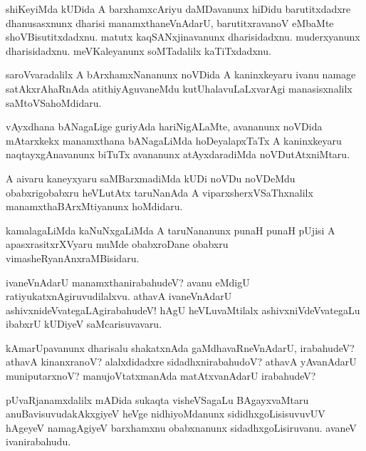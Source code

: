\documentclass{article}
\begin{document}
\begin{mn}
shiKeyiMda kUDida A barxhamxcAriyu daMDavanunx hiDidu barutitxdadxre dhanusasxnunx dharisi 
manamxthaneVnAdarU, barutitxravanoV eMbaMte shoVBisutitxdadxnu. matutx kaqSANxjinavanunx 
dharisidadxnu. muderxyanunx dharisidadxnu. meVKaleyanunx soMTadalilx kaTiTxdadxnu.
\end{mn}

\begin{mn}
saroVvaradalilx A bArxhamxNananunx noVDida A kaninxkeyaru ivanu namage satAkxrAhaRnAda 
atithiyAguvaneMdu kutUhalavuLaLxvarAgi manasisxnalilx saMtoVSahoMdidaru.
\end{mn}

\begin{mn}
vAyxdhana bANagaLige guriyAda hariNigALaMte, avananunx  noVDida mAtarxkekx manamxthana 
bANagaLiMda hoDeyalapxTaTx A kaninxkeyaru naqtayxgAnavanunx biTuTx avananunx  atAyxdaradiMda 
noVDutAtxniMtaru.
\end{mn}

\begin{mn}
A aivaru kaneyxyaru saMBarxmadiMda kUDi noVDu noVDeMdu obabxrigobabxru heVLutAtx taruNanAda A 
viparxsherxVSaThxnalilx  manamxthaBArxMtiyanunx hoMdidaru.
\end{mn}

\begin{mn}
kamalagaLiMda kaNuNxgaLiMda  A taruNananunx punaH punaH pUjisi A apasxrasitxrXVyaru muMde 
obabxroDane obabxru vimasheRyanAnxraMBisidaru.
\end{mn}

\begin{mn}
ivaneVnAdarU manamxthanirabahudeV? avanu eMdigU ratiyukatxnAgiruvudilalxvu. athavA ivaneVnAdarU
ashivxnideVvategaLAgirabahudeV! hAgU heVLuvaMtilalx ashivxniVdeVvategaLu ibabxrU kUDiyeV 
saMcarisuvavaru.
\end{mn}

\begin{mn}
kAmarUpavanunx dharisalu shakatxnAda gaMdhavaRneVnAdarU, irabahudeV? athavA kinanxranoV?
alalxdidadxre sidadhxnirabahudoV? athavA yAvanAdarU muniputarxnoV? manujoVtatxmanAda 
matAtxvanAdarU irabahudeV? 
\end{mn}

\begin{mn}
pUvaRjanamxdalilx mADida sukaqta visheVSagaLu BAgayxvaMtaru anuBavisuvudakAkxgiyeV heVge 
nidhiyoMdanunx sididhxgoLisisuvuvUV hAgeyeV namagAgiyeV barxhamxnu obabxnanunx 
sidadhxgoLisiruvanu. avaneV ivanirabahudu.
\end{mn}
\end{document}
